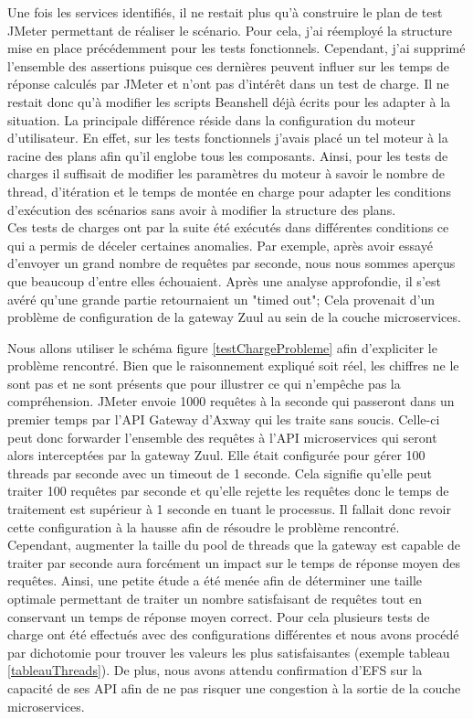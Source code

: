 	Une fois les services identifiés, il ne restait plus qu'à construire le plan de test JMeter permettant de réaliser le scénario. Pour cela, j'ai réemployé la structure mise en place précédemment pour les tests fonctionnels. Cependant, j'ai supprimé l'ensemble des assertions puisque ces dernières peuvent influer sur les temps de réponse calculés par JMeter et n'ont pas d'intérêt dans un test de charge. Il ne restait donc qu'à modifier les scripts Beanshell déjà écrits pour les adapter à la situation. La principale différence réside dans la configuration du moteur d'utilisateur. En effet, sur les tests fonctionnels j'avais placé un tel moteur à la racine des plans afin qu'il englobe tous les composants. Ainsi, pour les tests de charges il suffisait de modifier les paramètres du moteur à savoir le nombre de thread, d'itération et le temps de montée en charge pour adapter les conditions d'exécution des scénarios sans avoir à modifier la structure des plans. \\
	
	Ces tests de charges ont par la suite été exécutés dans différentes conditions ce qui a permis de déceler certaines anomalies. Par exemple, après avoir essayé d'envoyer un grand nombre de requêtes par seconde, nous nous sommes aperçus que beaucoup d'entre elles échouaient. Après une analyse approfondie, il s'est avéré qu'une grande partie retournaient un "timed out"; Cela provenait d'un problème de configuration de la gateway Zuul au sein de la couche microservices.
	
	Nous allons utiliser le schéma figure \ref{testChargeProbleme} afin d'expliciter le problème rencontré. Bien que le raisonnement expliqué soit réel, les chiffres ne le sont pas et ne sont présents que pour illustrer ce qui n'empêche pas la compréhension. JMeter envoie 1000 requêtes à la seconde qui passeront dans un premier temps par l'API Gateway d'Axway qui les traite sans soucis. Celle-ci peut donc forwarder l'ensemble des requêtes à l'API microservices qui seront alors interceptées par la gateway Zuul. Elle était configurée pour gérer 100 threads par seconde avec un timeout de 1 seconde. Cela signifie qu'elle peut traiter 100 requêtes par seconde et qu'elle rejette les requêtes donc le temps de traitement est supérieur à 1 seconde en tuant le processus. Il fallait donc revoir cette configuration à la hausse afin de résoudre le problème rencontré. Cependant, augmenter la taille du pool de threads que la gateway est capable de traiter par seconde aura forcément un impact sur le temps de réponse moyen des requêtes. Ainsi, une petite étude a été menée afin de déterminer une taille optimale permettant de traiter un nombre satisfaisant de requêtes tout en conservant un temps de réponse moyen correct. Pour cela plusieurs tests de charge ont été effectués avec des configurations différentes et nous avons procédé par dichotomie pour trouver les valeurs les plus satisfaisantes (exemple tableau \ref{tableauThreads}). De plus, nous avons attendu confirmation d'EFS sur la capacité de ses API afin de ne pas risquer une congestion à la sortie de la couche microservices.
	
